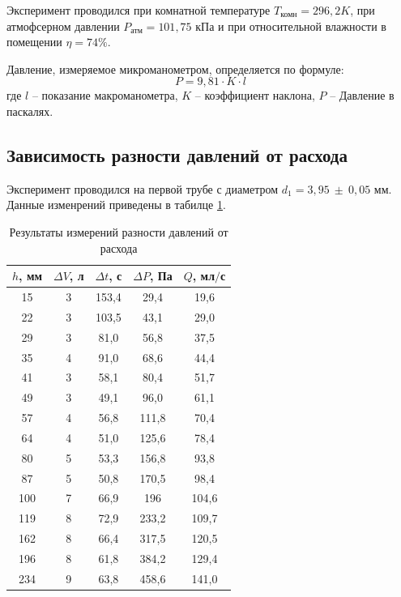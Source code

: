 \documentclass[a4paper,12pt]{article} %
\begin{document}
Эксперимент проводился при комнатной температуре $T_\text{комн}=296,2 K$, при атмофсерном давлении $P_\text{атм}=101,75$ кПа и при относительной влажности в помещении $\eta=74\%$.

Давление, измеряемое микроманометром, определяется по формуле:
\[
P=9,81 \cdot K \cdot l 
\]
где $l$ -- показание макроманометра, $K$ -- коэффициент наклона, $P$ -- Давление в паскалях.

\subsection{Зависимость разности давлений от расхода}
Эксперимент проводился на первой трубе с диаметром $d_1=3,95\ \pm\ 0,05$ мм. Данные изменрений приведены в табилце \ref{tab:q(p)}.

\begin{table}[H]
    \centering
    \begin{tabular}{|c|c|c|c|c|}
        \hline $h$, мм & $\Delta V$, л & $\Delta t$, с & $\Delta P$, Па & $Q$, мл$/$с \\
        \hline 15 & 3 & 153,4 & 29,4 & 19,6 \\
        \hline 22 & 3 & 103,5 & 43,1 & 29,0 \\
        \hline 29 & 3 & 81,0 & 56,8 & 37,5 \\
        \hline 35 & 4 & 91,0 & 68,6 & 44,4 \\
        \hline 41 & 3 & 58,1 & 80,4 & 51,7 \\
        \hline 49 & 3 & 49,1 & 96,0 & 61,1 \\
        \hline 57 & 4 & 56,8 & 111,8 & 70,4 \\
        \hline 64 & 4 & 51,0 & 125,6 & 78,4 \\ \hline
        \hline 80 & 5 & 53,3 & 156,8 & 93,8 \\
        \hline 87 & 5 & 50,8 & 170,5 & 98,4 \\
        \hline 100 & 7 & 66,9 & 196 & 104,6 \\
        \hline 119 & 8 & 72,9 & 233,2 & 109,7 \\
        \hline 162 & 8 & 66,4 & 317,5 & 120,5 \\
        \hline 196 & 8 & 61,8 & 384,2 & 129,4 \\
        \hline 234 & 9 & 63,8 & 458,6 & 141,0\\ \hline
    \end{tabular}
    \caption{Результаты измерений разности давлений от расхода}
    \label{tab:q(p)}
\end{table}
\end{document}
